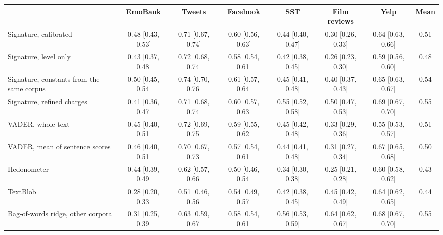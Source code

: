\begin{tabular}{@{}lccccccc@{}}
\toprule
 & EmoBank & Tweets & Facebook & SST & Film reviews & Yelp & Mean \\
\midrule
Signature, calibrated & 0.48 {\scriptsize[0.43, 0.53]} & 0.71 {\scriptsize[0.67, 0.74]} & 0.60 {\scriptsize[0.56, 0.63]} & 0.44 {\scriptsize[0.40, 0.47]} & 0.30 {\scriptsize[0.26, 0.33]} & 0.64 {\scriptsize[0.63, 0.66]} & 0.51 \\
Signature, level only & 0.43 {\scriptsize[0.37, 0.48]} & 0.72 {\scriptsize[0.68, 0.74]} & 0.58 {\scriptsize[0.54, 0.61]} & 0.42 {\scriptsize[0.38, 0.45]} & 0.26 {\scriptsize[0.23, 0.30]} & 0.59 {\scriptsize[0.56, 0.60]} & 0.48 \\
Signature, constants from the same corpus & 0.50 {\scriptsize[0.45, 0.54]} & 0.74 {\scriptsize[0.70, 0.76]} & 0.61 {\scriptsize[0.57, 0.64]} & 0.45 {\scriptsize[0.41, 0.48]} & 0.40 {\scriptsize[0.37, 0.43]} & 0.65 {\scriptsize[0.63, 0.67]} & 0.54 \\
Signature, refined charges & 0.41 {\scriptsize[0.36, 0.47]} & 0.71 {\scriptsize[0.68, 0.74]} & 0.60 {\scriptsize[0.57, 0.63]} & 0.55 {\scriptsize[0.52, 0.58]} & 0.50 {\scriptsize[0.47, 0.53]} & 0.69 {\scriptsize[0.67, 0.70]} & 0.55 \\
VADER, whole text & 0.45 {\scriptsize[0.40, 0.51]} & 0.72 {\scriptsize[0.69, 0.75]} & 0.59 {\scriptsize[0.55, 0.62]} & 0.45 {\scriptsize[0.42, 0.48]} & 0.33 {\scriptsize[0.29, 0.36]} & 0.55 {\scriptsize[0.53, 0.57]} & 0.51 \\
VADER, mean of sentence scores & 0.46 {\scriptsize[0.40, 0.51]} & 0.70 {\scriptsize[0.67, 0.73]} & 0.57 {\scriptsize[0.54, 0.61]} & 0.44 {\scriptsize[0.41, 0.48]} & 0.31 {\scriptsize[0.27, 0.34]} & 0.67 {\scriptsize[0.65, 0.68]} & 0.50 \\
Hedonometer & 0.44 {\scriptsize[0.39, 0.49]} & 0.62 {\scriptsize[0.57, 0.66]} & 0.50 {\scriptsize[0.46, 0.54]} & 0.34 {\scriptsize[0.30, 0.38]} & 0.25 {\scriptsize[0.21, 0.28]} & 0.60 {\scriptsize[0.58, 0.62]} & 0.43 \\
TextBlob & 0.28 {\scriptsize[0.20, 0.33]} & 0.51 {\scriptsize[0.46, 0.56]} & 0.54 {\scriptsize[0.49, 0.57]} & 0.42 {\scriptsize[0.38, 0.45]} & 0.45 {\scriptsize[0.42, 0.49]} & 0.64 {\scriptsize[0.62, 0.65]} & 0.44 \\
Bag-of-words ridge, other corpora & 0.31 {\scriptsize[0.25, 0.39]} & 0.63 {\scriptsize[0.59, 0.67]} & 0.58 {\scriptsize[0.54, 0.61]} & 0.56 {\scriptsize[0.53, 0.59]} & 0.64 {\scriptsize[0.62, 0.67]} & 0.68 {\scriptsize[0.67, 0.70]} & 0.55 \\

\end{tabular}
